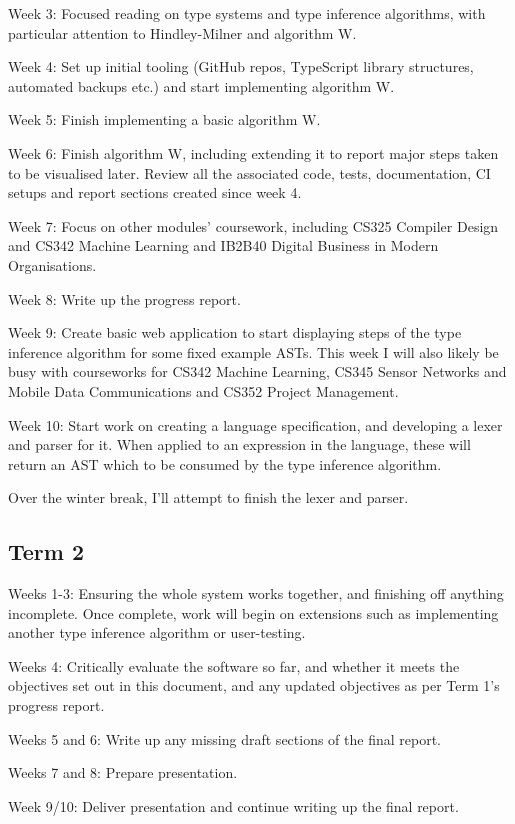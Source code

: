 \documentclass[12pt]{article}
\begin{document}
Week 3: Focused reading on type systems and type inference algorithms, with particular attention to Hindley-Milner and algorithm W.

Week 4: Set up initial tooling (GitHub repos, TypeScript library structures, automated backups etc.) and start implementing algorithm W.

Week 5: Finish implementing a basic algorithm W.

Week 6: Finish algorithm W, including extending it to report major steps taken to be visualised later. Review all the associated code, tests, documentation, CI setups and report sections created since week 4.

Week 7: Focus on other modules’ coursework, including CS325 Compiler Design and CS342 Machine Learning and IB2B40 Digital Business in Modern Organisations.

Week 8: Write up the progress report.

Week 9: Create basic web application to start displaying steps of the type inference algorithm for some fixed example ASTs. This week I will also likely be busy with courseworks for CS342 Machine Learning, CS345 Sensor Networks and Mobile Data Communications and CS352 Project Management.

Week 10: Start work on creating a language specification, and developing a lexer and parser for it. When applied to an expression in the language, these will return an AST which to be consumed by the type inference algorithm.

Over the winter break, I’ll attempt to finish the lexer and parser.

\subsection{Term 2}

Weeks 1-3: Ensuring the whole system works together, and finishing off anything incomplete. Once complete, work will begin on extensions such as implementing another type inference algorithm or user-testing.

Weeks 4: Critically evaluate the software so far, and whether it meets the objectives set out in this document, and any updated objectives as per Term 1’s progress report.

Weeks 5 and 6: Write up any missing draft sections of the final report.

Weeks 7 and 8: Prepare presentation.

Week 9/10: Deliver presentation and continue writing up the final report.
\end{document}
